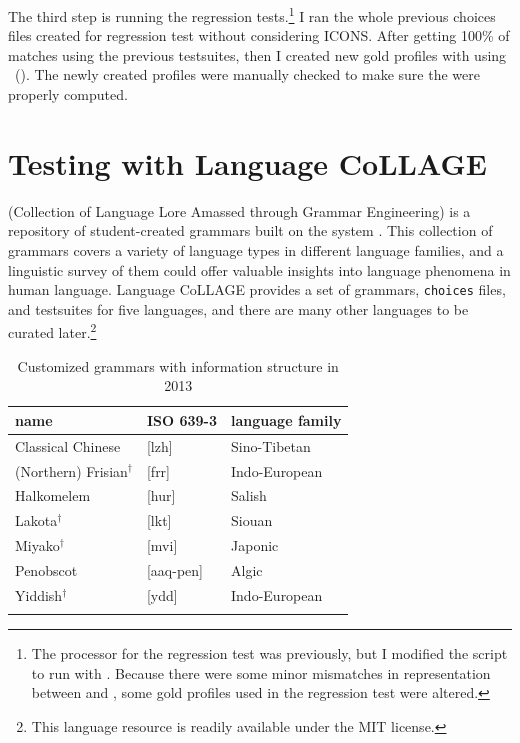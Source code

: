 The third step is running the regression tests.\footnote{The processor
  for the regression test was {\isi{\lkb}} previously, but I modified
  the script to run with \isi{\ace}. Because there were some minor
  mismatches in representation between \isi{\lkb} and \isi{\ace}, some
  gold profiles used in the regression test were altered.}  I ran the
whole previous choices files created for regression test without
considering ICONS.  After getting 100\% of matches using the previous
testsuites, then I created new gold profiles with  using
\isi{\ace}~().  The newly
created profiles were manually checked to make sure the 
were properly computed.



\section{Testing with Language CoLLAGE}
\label{13:sec:collage}

 (Collection of Language Lore Amassed through
Grammar Engineering) is a repository of student-created grammars built
on the \lingo {} system \citep{bender:14}.  This
collection of grammars covers a variety of language types in different
language families, and a linguistic survey of them could offer
valuable insights into language phenomena in human language.  Language
CoLLAGE provides a set of grammars,
\texttt{choices} files, and testsuites for five languages, and there
are many other languages to be curated later.\footnote{This language resource
is readily available under the MIT license.}



\begin{table}[!t]
\small
\centering
\caption{Customized grammars with information structure in 2013}
\label{tbl:ling567:2013}
\begin{tabular}{lll}
\lsptoprule
\textbf{name} & \textbf{ISO 639-3} & \textbf{language family} \\ \hline
\midrule 
Classical Chinese & [lzh] & Sino-Tibetan\\ 
(Northern) Frisian$^\ensuremath{\dagger}$ & [frr] & Indo-European\\ 
Halkomelem & [hur] & Salish\\ 
Lakota$^\ensuremath{\dagger}$ & [lkt] & Siouan\\ 
Miyako$^\ensuremath{\dagger}$ & [mvi] & Japonic\\ 
Penobscot & [aaq-pen] & Algic\\ 
Yiddish$^\ensuremath{\dagger}$ & [ydd]	& Indo-European\\ 
\lspbottomrule
\end{tabular}
\end{table}


